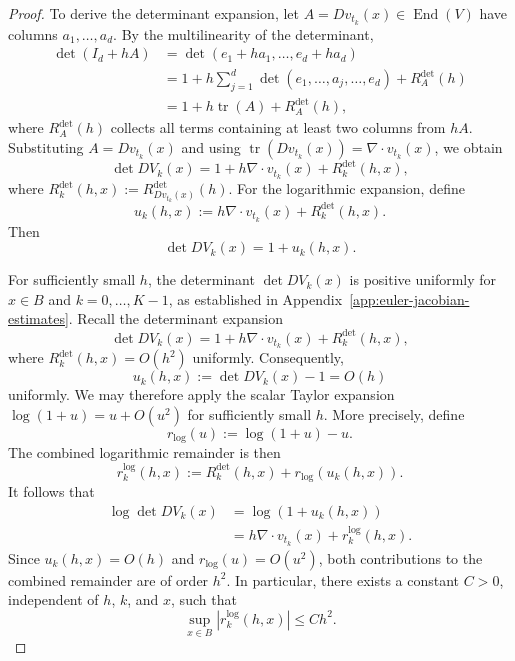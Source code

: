 \documentclass[12pt,a4paper,oneside]{book}
\begin{document}
\begin{proof}
To derive the determinant expansion, let $A = Dv_{t_k}(x) \in\operatorname{End}(V)$ have columns $a_1,\ldots,a_d$. By the
multilinearity of the determinant,
\begin{equation*}
    \begin{aligned}
        \det(I_d+hA) &= \det(e_1+ha_1,\ldots,e_d+ha_d)\\
        &= 1 + h\sum_{j=1}^d \det(e_1,\ldots,a_j,\ldots,e_d) + R_A^{\det}(h)\\
        &= 1 + h\operatorname{tr}(A)+R_A^{\det}(h),
    \end{aligned}
\end{equation*}
where $R_A^{\det}(h)$ collects all terms containing at least two columns from $hA$. Substituting $A = Dv_{t_k}(x)$ and using
$\operatorname{tr}(Dv_{t_k}(x))=\nabla\cdot v_{t_k}(x)$, we obtain
\begin{equation*}
    \det DV_k(x) = 1 + h\nabla\cdot v_{t_k}(x) + R_k^{\det}(h,x),
\end{equation*}
where $R_k^{\det}(h,x) := R_{Dv_{t_k}(x)}^{\det}(h)$. For the logarithmic expansion, define
\begin{equation*}
    u_k(h,x) := h\nabla\cdot v_{t_k}(x) + R_k^{\det}(h,x).
\end{equation*}
Then
\begin{equation*}
    \det DV_k(x)=1+u_k(h,x).
\end{equation*}

For sufficiently small $h$, the determinant $\det DV_k(x)$ is positive uniformly for $x\in B$ and $k=0,\ldots,K-1$, as
established in Appendix~\ref{app:euler-jacobian-estimates}. Recall the determinant expansion
\begin{equation*}
    \det DV_k(x) = 1+h\nabla\cdot v_{t_k}(x)+R_k^{\det}(h,x),
\end{equation*}
where $R_k^{\det}(h,x)=O(h^2)$ uniformly. Consequently,
\begin{equation*}
    u_k(h,x):=\det DV_k(x)-1=O(h)
\end{equation*}
uniformly. We may therefore apply the scalar Taylor expansion
$\log(1+u)=u+O(u^2)$ for sufficiently small $h$. More precisely, define
\begin{equation*}
    r_{\log}(u):=\log(1+u)-u.
\end{equation*}
The combined logarithmic remainder is then
\begin{equation*}
    r_k^{\log}(h,x)
    :=R_k^{\det}(h,x)+r_{\log}(u_k(h,x)).
\end{equation*}
It follows that
\begin{equation*}
    \begin{aligned}
        \log\det DV_k(x)
        &=\log(1+u_k(h,x))\\
        &=h\nabla\cdot v_{t_k}(x)+r_k^{\log}(h,x).
    \end{aligned}
\end{equation*}
Since $u_k(h,x)=O(h)$ and $r_{\log}(u)=O(u^2)$, both contributions
to the combined remainder are of order $h^2$. In particular, there
exists a constant $C>0$, independent of $h$, $k$, and $x$, such that
\begin{equation*}
    \sup_{x\in B}|r_k^{\log}(h,x)|\leq Ch^2.
\end{equation*}



\end{proof}
\end{document}
